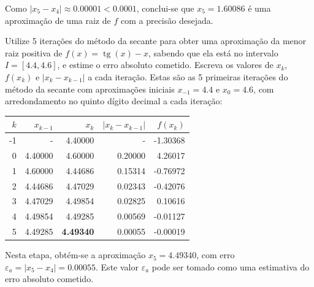 \documentclass[12pt,a4paper]{article}
\newcommand*\tg{\operatorname{tg}}
\begin{document}
\begin{ExerciseList}
\begin{enumerate}
Como $|x_5 - x_4| \approx 0.00001 < 0.0001$, conclui-se que $x_5 = 1.60086$ é uma aproximação de uma raiz de $f$ com a precisão desejada.
\end{enumerate}

\Exercise[title={2,0}]
Utilize 5 iterações do método da secante para obter uma aproximação da menor raiz positiva de $f(x) = \tg(x) - x$, sabendo que ela está no intervalo $I = [4.4, 4.6]$, e estime o erro absoluto cometido. Escreva os valores de $x_k$, $f(x_k)$ e $|x_k - x_{k-1}|$ a cada iteração.%
\Answer
Estas são as 5 primeiras iterações do método da secante com aproximações iniciais $x_{-1} = 4.4$ e $x_{0} = 4.6$, com arredondamento no quinto dígito decimal a cada iteração:

\begin{center}
\begin{tabular}{|r|r|r|r|r|}
\hline
$k$ &  $x_{k-1}$ &  $x_k$ & $|x_k - x_{k-1}|$ & $f(x_k)$ \\
\hline
-1 &       - & 4.40000 & - & -1.30368 \\
\hline
 0 & 4.40000 & 4.60000 & 0.20000 & 4.26017 \\
\hline
 1 & 4.60000 & 4.44686 & 0.15314 & -0.76972 \\
\hline
 2 & 4.44686 & 4.47029 & 0.02343 & -0.42076 \\
\hline
 3 & 4.47029 & 4.49854 & 0.02825 & 0.10616 \\
\hline
 4 & 4.49854 & 4.49285 & 0.00569 & -0.01127 \\
\hline
 5 & 4.49285 & \textbf{4.49340} & 0.00055 & -0.00019 \\
\hline
\end{tabular}
\end{center}
\medskip
Nesta etapa, obtém-se a aproximação $x_5 = 4.49340$, com erro $\varepsilon_a = |x_5 - x_4| = 0.00055$. Este valor $\varepsilon_a$ pode ser tomado como uma estimativa do erro absoluto cometido.



\end{ExerciseList}
\end{document}
